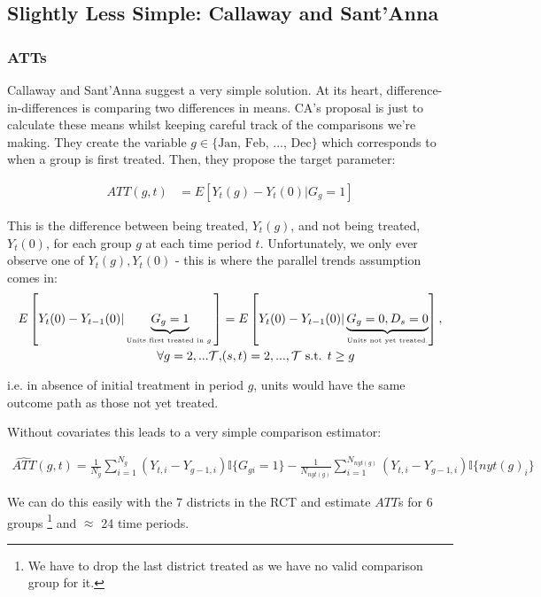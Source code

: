 \documentclass{article}
\begin{document}
\subsection*{Slightly Less Simple: Callaway and Sant'Anna}
\subsubsection*{ATTs}
Callaway and Sant'Anna suggest a very simple solution. At its heart, difference-in-differences
is comparing two differences in means. CA's proposal is just to calculate these means
whilst keeping careful track of the comparisons we're making. They create the 
variable $g \in \{ \text{Jan, Feb, ..., Dec}\}$ which corresponds to when a group 
is first treated. Then, they propose the target parameter:


\begin{align*}
   ATT(g,t) &= E\left[ 
      Y_t(g) - Y_t(0) | G_g = 1
   \right]
\end{align*}

This is the difference between being treated, $Y_t(g)$, and 
not being treated, $Y_t(0)$, for each group $g$ at each time period $t$. Unfortunately, 
we only ever observe one of $Y_t(g), Y_t(0)$ - this is where the parallel trends 
assumption comes in:
\begin{align*}
   E\left[Y_t(0) - Y_{t-1}(0) | \underbrace{G_g = 1}_{\text{{\tiny Units first treated in $g$.}}}\right] &= 
   E\left[
      Y_t(0) - Y_{t-1}(0) | \underbrace{G_g  = 0 , D_s = 0}_\text{{\tiny Units not yet treated.}} 
   \right],  \\ \forall g = 2, ... \mathcal{T}, & (s,t) = 2, ..., \mathcal{T} \text{ s.t. } t \geq g
\end{align*}

    i.e. in absence of initial treatment in period $g$, units would 
    have the same outcome path as those not yet treated. 

   Without covariates this leads to a very simple comparison estimator:

   \begin{align*}
      \hat{ATT}(g,t) = \frac{1}{N_g} \sum_{i=1}^{N_g}  (Y_{t,i} - Y_{g-1,i}) \mathbb{I}\{G_{gi} = 1\} -
      \frac{1}{N_{nyt(g)}} \sum_{i=1}^{N_{nyt(g)}} (Y_{t,i} - Y_{g-1,i})\mathbb{I}\{nyt(g)_i\} 
   \end{align*}


   We can do this easily with the 7 districts in the RCT and estimate $ATT$s for 
   6 groups \footnote{We have to drop the last district treated as we have no valid comparison 
   group for it.} and $\approx$ 24 time periods.
   
\end{document}
